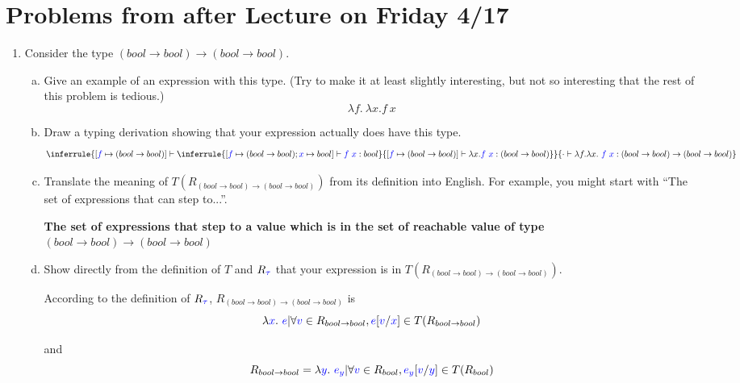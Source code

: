 \documentclass{article}
\newcommand{\meta}[1]{{\color{blue}#1}}
\begin{document}
\section*{Problems from after Lecture on Friday 4/17}

\begin{enumerate}[resume*]
\item Consider the type $(bool\to bool)\to (bool\to bool)$.
  \begin{enumerate}[(a)]
  \item Give an example of an expression with this type. (Try to make it at
    least slightly interesting, but not so interesting that the rest of this
    problem is tedious.)
    $$\lambda f.\ \lambda x. f\ x$$

  \item Draw a typing derivation showing that your expression actually does have this type.
    $$\inferrule{
      [\meta{f} \mapsto (bool \to bool)]\vdash \inferrule{
        [\meta{f}\mapsto (bool \to bool);\meta{x} \mapsto bool]\vdash \meta{f}\ \meta{x} : bool 
      }{[\meta{f}\mapsto (bool \to bool)]\vdash \lambda x. \meta{f}\ \meta{x} : (bool \to bool)}
    }{\cdot \vdash \lambda f. \lambda x.\ \meta{f}\ \meta{x} : (bool \to bool) \to (bool \to bool)}$$
  \item Translate the meaning of $T(R_{(bool\to bool)\to (bool\to bool)})$ from
    its definition into English. For example, you might start with ``The set of
    expressions that can step to...''.
    
    \textbf{The set of expressions that step to a value which is in the set of reachable value of type $(bool \to bool)\to (bool \to bool)$}

  \item Show directly from the definition of $T$ and $R_{\meta{\tau}}$ that your
    expression is in $T(R_{(bool\to bool)\to (bool\to bool)})$.

    According to the definition of $R_{\meta{\tau}}$, $R_{(bool \to bool)\to (bool \to bool)}$ is
    $$\set{\lambda \meta{x}.\ \meta{e} | \forall \meta{v} \in R_{bool \to bool},\meta{e}[\meta{v}/\meta{x}] \in T(R_{bool \to bool})}$$

    and $$R_{bool \to bool}=\set{\lambda \meta{y}.\ \meta{e_y}| \forall \meta{v} \in R_{bool}, \meta{e_y}[\meta{v}/\meta{y}] \in T(R_{bool})}$$


\end{enumerate}
\end{enumerate}
\end{document}
